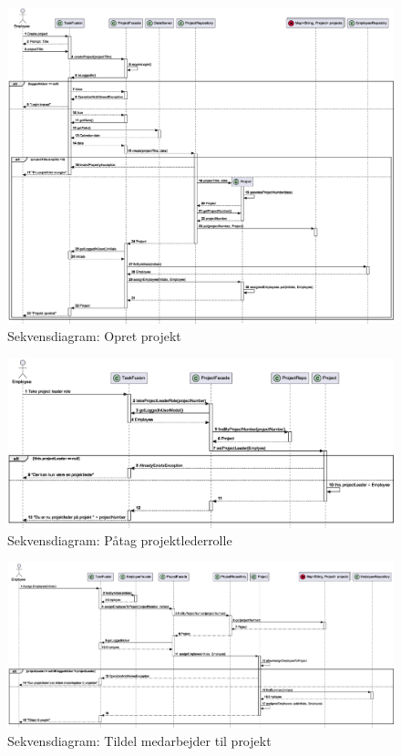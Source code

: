 \begin{figure}[H]
    \centering
    \caption{Sekvensdiagram: Opret projekt}\label{fig:sequenceCreateProject}
    \includegraphics[width=\textwidth]{RequirementsAndDesign/SequenceDiagrams/seqCreateProject.eps}
\end{figure}
\begin{figure}[H]
    \centering
    \caption{Sekvensdiagram: Påtag projektlederrolle}\label{fig:sequenceTakePLRole}
    \includegraphics[width=\textwidth]{RequirementsAndDesign/SequenceDiagrams/seqTakePLRole.eps}
\end{figure}
\begin{figure}[H]
    \centering
    \caption{Sekvensdiagram: Tildel medarbejder til projekt}\label{fig:sequenceAssignEmployee}
    \includegraphics[width=\textwidth]{RequirementsAndDesign/SequenceDiagrams/seqAssignEmployee.eps}
\end{figure}
